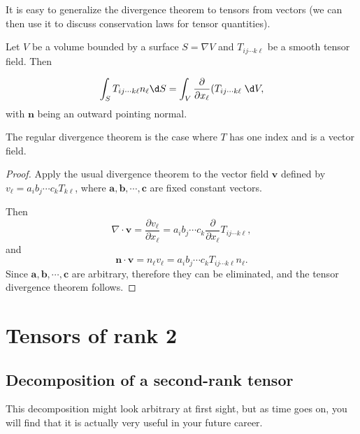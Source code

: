 \documentclass[a4paper]{article}
\begin{document}
It is easy to generalize the divergence theorem to tensors from vectors (we can then use it to discuss conservation laws for tensor quantities).

Let $V$ be a volume bounded by a surface $S=\nabla V$ and $T_{ij\cdots k\ell}$ be a smooth tensor field. Then

\begin{thm}
  \[
    \int_S T_{ij\cdots k\ell}n_\ell \d S = \int_V \frac{\partial}{\partial x_\ell}(T_{ij\cdots k\ell}\;\d V,
  \]
  with $\mathbf{n}$ being an outward pointing normal.
\end{thm}
The regular divergence theorem is the case where $T$ has one index and is a vector field.

\begin{proof}
  Apply the usual divergence theorem to the vector field $\mathbf{v}$ defined by $v_\ell = a_i b_j \cdots c_k T_{k\ell}$, where $\mathbf{a}, \mathbf{b}, \cdots, \mathbf{c}$ are fixed constant vectors.

  Then
  \[
    \nabla\cdot \mathbf{v} = \frac{\partial v_\ell}{\partial x_\ell} = a_i b_j \cdots c_k \frac{\partial}{\partial x_\ell}T_{ij\cdots k\ell},
  \]
  and
  \[
    \mathbf{n}\cdot \mathbf{v} = n_\ell v_\ell = a_i b_j \cdots c_k T_{ij\cdots k\ell }n_\ell.
  \]
  Since $\mathbf{a}, \mathbf{b}, \cdots, \mathbf{c}$ are arbitrary, therefore they can be eliminated, and the tensor divergence theorem follows.
\end{proof}
\section{Tensors of rank 2}
\subsection{Decomposition of a second-rank tensor}
This decomposition might look arbitrary at first sight, but as time goes on, you will find that it is actually very useful in your future career.
\end{document}
